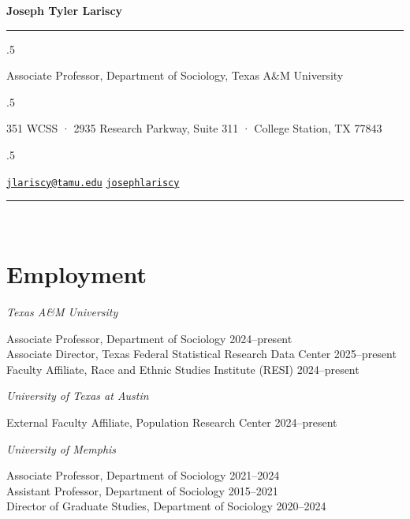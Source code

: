 \documentclass[11pt,]{article}
\begin{document}
\centerline{\huge \bf Joseph Tyler Lariscy}

\vspace{2 mm}

\hrule

\vspace{2 mm}

\moveleft.5\hoffset\centerline{Associate Professor, Department of
Sociology, Texas A\&M University}
\moveleft.5\hoffset\centerline{351 WCSS · 2935 Research Parkway, Suite
311 · College Station, TX 77843}
\moveleft.5\hoffset\centerline{ \faEnvelopeO \hspace{1 mm} \href{mailto:}{\tt \href{mailto:jlariscy@tamu.edu}{\nolinkurl{jlariscy@tamu.edu}}} \hspace{1 mm}  \faGithub \hspace{1 mm} \href{http://github.com/josephlariscy}{\tt josephlariscy} \hspace{1 mm}      } 

\vspace{2 mm}

\hrule


~

\section{Employment}\label{employment}

\emph{Texas A\&M University}

\setlength{\leftskip}{1cm}

Associate Professor, Department of Sociology \hfill 2024--present\\
Associate Director, Texas Federal Statistical Research Data Center
\hfill 2025--present\\
Faculty Affiliate, Race and Ethnic Studies Institute (RESI)
\hfill 2024--present

\setlength{\leftskip}{0cm}

\emph{University of Texas at Austin}

\setlength{\leftskip}{1cm}

External Faculty Affiliate, Population Research Center
\hfill 2024--present

\setlength{\leftskip}{0cm}

\emph{University of Memphis}

\setlength{\leftskip}{1cm}

Associate Professor, Department of Sociology \hfill 2021--2024\\
Assistant Professor, Department of Sociology \hfill 2015--2021\\
Director of Graduate Studies, Department of Sociology \hfill 2020--2024
\end{document}
